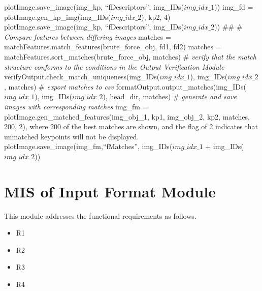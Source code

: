 \documentclass[12pt, titlepage]{article}
\begin{document}
plotImage.save\_image(img\_kp, ``fDescriptors'', img\_IDs($img\_idx\_{1}$))\newline \newline
img\_fd = plotImage.gen\_kp\_img(img\_IDs($img\_idx\_{2}$), kp2, 4)\newline
plotImage.save\_image(img\_kp, ``fDescriptors'', img\_IDs($img\_idx\_{2}$))\newline \newline
\#\# \newline \newline
\# \textit{Compare features between differing images} \newline 
matches = matchFeatures.match\_features(brute\_force\_obj, fd1, fd2) \newline
matches = matchFeatures.sort\_matches(brute\_force\_obj, matches) \newline \newline
\# \textit{verify that the match structure conforms to the conditions in the
Output Verification Module} \newline 
verifyOutput.check\_match\_uniqueness(img\_IDs($img\_idx\_{1}$), img\_IDs($img\_idx\_{2}$, matches)\newline \newline
\# \textit{export matches to csv} \newline
formatOutput.output\_matches(img\_IDs($img\_idx\_{1}$), img\_IDs($img\_idx\_{2}$), head\_dir, matches) \newline \newline
\# \textit{generate and save images with corresponding matches} \newline
img\_fm = plotImage.gen\_matched\_features(img\_obj\_1, kp1, img\_obj\_2, kp2, matches, 200, 2), where 200 of the best matches are shown,
and the flag of 2 indicates that unmatched keypoints will not be displayed.\newline
plotImage.save\_image(img\_fm,``fMatches'', img\_IDs($img\_idx\_{1}$ + img\_IDs($img\_idx\_{2}$))


\newpage
\section{MIS of Input Format Module} \label{mIF}
This module addresses the functional requirements as follows.
\begin{itemize}
  \item R1
  \item R2
  \item R3
  \item R4
\end{itemize}
\end{document}
